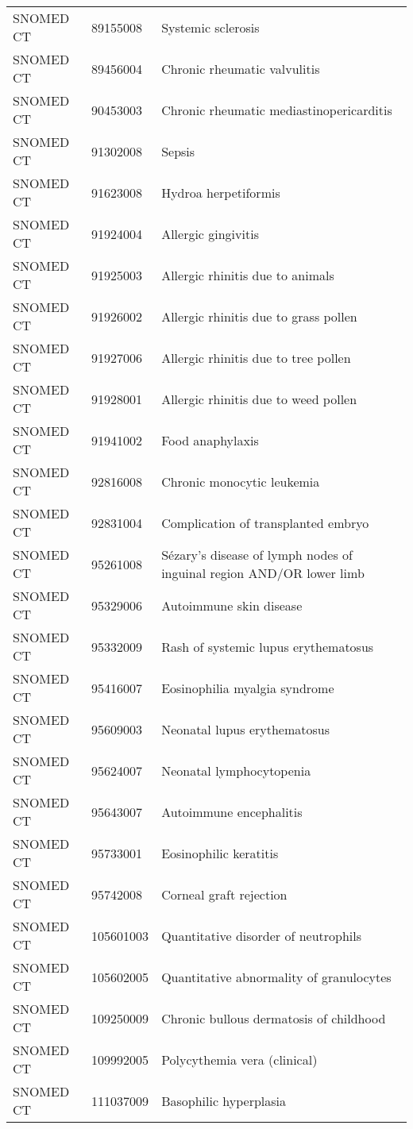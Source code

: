 \begin{longtable}{p{}p{}p{}}
  SNOMED CT & 89155008 & Systemic sclerosis \\ 
  SNOMED CT & 89456004 & Chronic rheumatic valvulitis \\ 
  SNOMED CT & 90453003 & Chronic rheumatic mediastinopericarditis \\ 
  SNOMED CT & 91302008 & Sepsis \\ 
  SNOMED CT & 91623008 & Hydroa herpetiformis \\ 
  SNOMED CT & 91924004 & Allergic gingivitis \\ 
  SNOMED CT & 91925003 & Allergic rhinitis due to animals \\ 
  SNOMED CT & 91926002 & Allergic rhinitis due to grass pollen \\ 
  SNOMED CT & 91927006 & Allergic rhinitis due to tree pollen \\ 
  SNOMED CT & 91928001 & Allergic rhinitis due to weed pollen \\ 
  SNOMED CT & 91941002 & Food anaphylaxis \\ 
  SNOMED CT & 92816008 & Chronic monocytic leukemia \\ 
  SNOMED CT & 92831004 & Complication of transplanted embryo \\ 
  SNOMED CT & 95261008 & Sézary's disease of lymph nodes of inguinal region AND/OR lower limb \\ 
  SNOMED CT & 95329006 & Autoimmune skin disease \\ 
  SNOMED CT & 95332009 & Rash of systemic lupus erythematosus \\ 
  SNOMED CT & 95416007 & Eosinophilia myalgia syndrome \\ 
  SNOMED CT & 95609003 & Neonatal lupus erythematosus \\ 
  SNOMED CT & 95624007 & Neonatal lymphocytopenia \\ 
  SNOMED CT & 95643007 & Autoimmune encephalitis \\ 
  SNOMED CT & 95733001 & Eosinophilic keratitis \\ 
  SNOMED CT & 95742008 & Corneal graft rejection \\ 
  SNOMED CT & 105601003 & Quantitative disorder of neutrophils \\ 
  SNOMED CT & 105602005 & Quantitative abnormality of granulocytes \\ 
  SNOMED CT & 109250009 & Chronic bullous dermatosis of childhood \\ 
  SNOMED CT & 109992005 & Polycythemia vera (clinical) \\ 
  SNOMED CT & 111037009 & Basophilic hyperplasia \\ 

\end{longtable}
